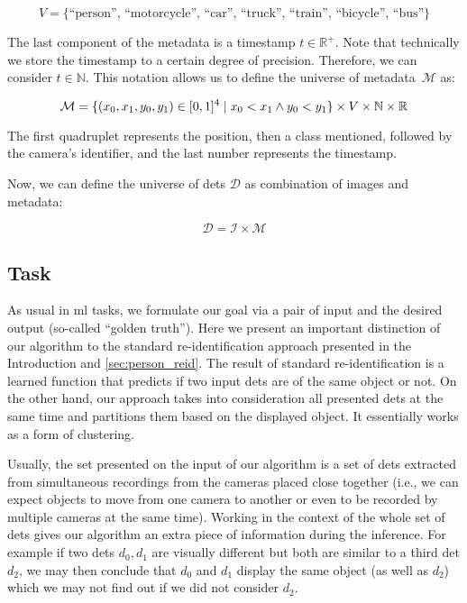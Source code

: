 $$V = \{\text{``person'', ``motorcycle'', ``car'', ``truck'', ``train'', ``bicycle'', ``bus''\}}$$


The last component of the metadata is a timestamp $t \in \mathbb{R}^+$. Note that technically we store the timestamp to a certain degree of precision. Therefore, we can consider $t \in \mathbb{N}$. This notation allows us to define the universe of metadata~$\mathcal{M}$ as:

$$\mathcal{M} = \{{(x_0, x_1, y_0, y_1) \in [0,1]^4 \mid x_0 < x_1 \land y_0 < y_1}\} \times V \times \mathbb{N} \times \mathbb{R}$$

The first quadruplet represents the position, then a class mentioned, followed by the camera's identifier, and the last number represents the timestamp.

Now, we can define the universe of \glspl{det} $\mathcal{D}$ as combination of images and metadata:

$$\mathcal{D} = \mathcal{I \times M}$$

\subsection{Task}

\label{ssec:task}

As usual in \gls{ml} tasks, we formulate our goal via a pair of input and the desired output (so-called ``golden truth''). Here we present an important distinction of our algorithm to the standard re-identification approach presented in the Introduction and \autoref{sec:person_reid}. The result of standard re-identification is a learned function that predicts if two input \glspl{det} are of the same object or not. On the other hand, our approach takes into consideration all presented \glspl{det} at the same time and partitions them based on the displayed object. It essentially works as a form of clustering.

Usually, the set presented on the input of our algorithm is a set of \glspl{det} extracted from simultaneous recordings from the cameras placed close together (i.e., we can expect objects to move from one camera to another or even to be recorded by multiple cameras at the same time). Working in the context of the whole set of \glspl{det} gives our algorithm an extra piece of information during the inference. For example if two \glspl{det} $d_0, d_1$ are visually different but both are similar to a third \gls{det} $d_2$, we may then conclude that $d_0$ and $d_1$ display the same object (as well as $d_2$) which we may not find out if we did not consider $d_2$.



